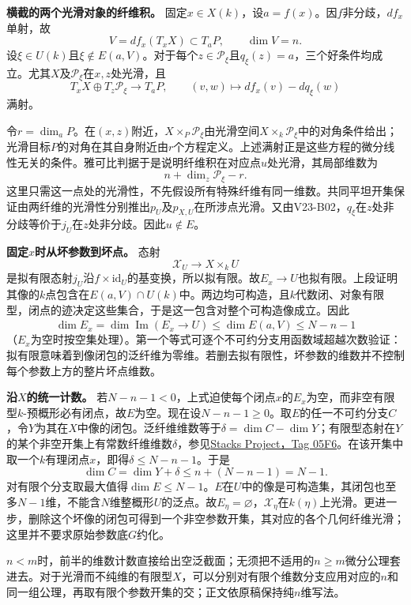 \documentclass[UTF8,a4paper]{ctexbook}
\newcommand{\id}{\mathrm{id}}
\newcommand{\lead}[1]{\par\smallskip\noindent\textbf{#1}\quad}
\begin{document}
\lead{横截的两个光滑对象的纤维积。}
固定$x\in X(k)$，设$a=f(x)$。因$f$非分歧，$df_x$单射，故
\[
V=df_x(T_xX)\subset T_aP,\qquad \dim V=n.
\]
设$\xi\in U(k)$且$\xi\notin E(a,V)$。对于每个$z\in\mathcal P_\xi$且$q_\xi(z)=a$，三个好条件均成立。尤其$X$及$\mathcal P_\xi$在$x,z$处光滑，且
\[
T_xX\oplus T_z\mathcal P_\xi\longrightarrow T_aP,
\qquad(v,w)\longmapsto df_x(v)-dq_\xi(w)
\]
满射。

令$r=\dim_aP$。在$(x,z)$附近，$X\times_P\mathcal P_\xi$由光滑空间$X\times_k\mathcal P_\xi$中的对角条件给出；光滑目标$P$的对角在其自身附近由$r$个方程定义。上述满射正是这些方程的微分线性无关的条件。雅可比判据于是说明纤维积在对应点$u$处光滑，其局部维数为
\[
n+\dim_z\mathcal P_\xi-r.
\]
这里只需这一点处的光滑性，不先假设所有特殊纤维有同一维数。共同平坦开集保证由两纤维的光滑性分别推出$p_U$及$p_{X,U}$在所涉点光滑。又由V23-B02，$q_\xi$在$z$处非分歧等价于$j_U$在$z$处非分歧。因此$u\notin E$。

\lead{固定$x$时从坏参数到坏点。}
态射
\[
\mathcal X_U\longrightarrow X\times_kU
\]
是拟有限态射$j_U$沿$f\times\id_U$的基变换，所以拟有限。故$E_x\to U$也拟有限。上段证明其像的$k$点包含在$E(a,V)\cap U(k)$中。两边均可构造，且$k$代数闭、对象有限型，闭点的迹决定这些集合，于是这一包含对整个可构造像成立。因此
\[
\dim E_x=\dim \overline{\operatorname{Im}(E_x\to U)}
\leq\dim E(a,V)\leq N-n-1
\]
（$E_x$为空时按空集处理）。第一个等式可逐个不可约分支用函数域超越次数验证：拟有限意味着到像闭包的泛纤维为零维。若删去拟有限性，坏参数的维数并不控制每个参数上方的整片坏点维数。

\lead{沿$X$的统一计数。}
若$N-n-1<0$，上式迫使每个闭点$x$的$E_x$为空，而非空有限型$k$-预概形必有闭点，故$E$为空。现在设$N-n-1\geq0$。取$E$的任一不可约分支$C$，令$Y$为其在$X$中像的闭包。泛纤维维数等于$\delta=\dim C-\dim Y$；有限型态射在$Y$的某个非空开集上有常数纤维维数$\delta$，参见\href{https://stacks.math.columbia.edu/tag/05F6}{Stacks Project，Tag 05F6}。在该开集中取一个$k$有理闭点$x$，即得$\delta\leq N-n-1$。于是
\[
\dim C=\dim Y+\delta\leq n+(N-n-1)=N-1.
\]
对有限个分支取最大值得$\dim E\leq N-1$。$E$在$U$中的像是可构造集，其闭包也至多$N-1$维，不能含$N$维整概形$U$的泛点。故$E_\eta=\varnothing$，$\mathcal X_\eta$在$k(\eta)$上光滑。更进一步，删除这个坏像的闭包可得到一个非空参数开集，其对应的各个几何纤维光滑；这里并不要求原始参数底$G$约化。

$n<m$时，前半的维数计数直接给出空泛截面；无须把不适用的$n\geq m$微分公理套进去。对于光滑而不纯维的有限型$X$，可以分别对有限个维数分支应用对应的$n$和同一组公理，再取有限个参数开集的交；正文依原稿保持纯$n$维写法。
\end{document}
